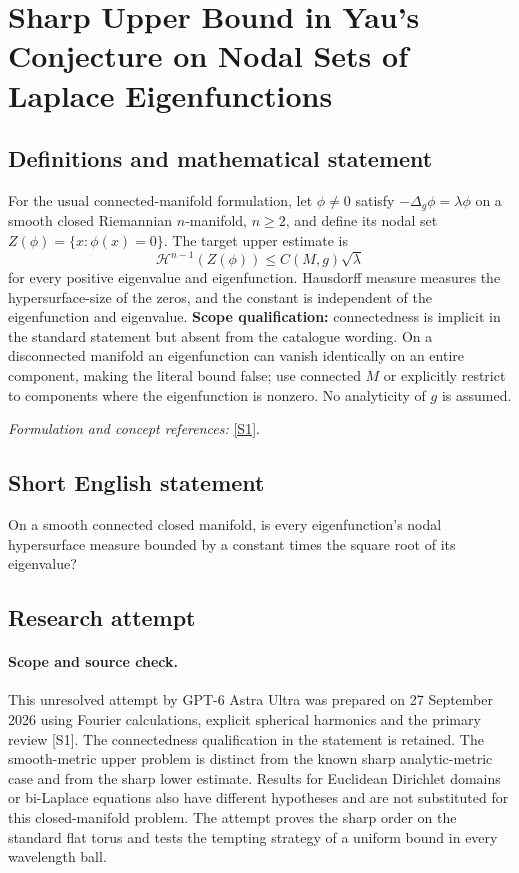 \documentclass[11pt]{article}
\begin{document}
\section*{\texorpdfstring{Sharp Upper Bound in Yau's Conjecture on Nodal Sets of Laplace Eigenfunctions}{Sharp Upper Bound in Yau's Conjecture on Nodal Sets of Laplace Eigenfunctions}}\label{30006830}
\subsection{Definitions and mathematical statement}
For the usual connected-manifold formulation, let $\phi\ne0$ satisfy
$-\Delta_g\phi=\lambda\phi$ on a smooth closed Riemannian $n$-manifold, $n\ge2$, and define its nodal set $Z(\phi)=\{x:\phi(x)=0\}$. The target upper estimate is
\[
 \mathcal H^{n-1}(Z(\phi))\le C(M,g)\sqrt\lambda
\]
for every positive eigenvalue and eigenfunction. Hausdorff measure measures the hypersurface-size of the zeros, and the constant is independent of the eigenfunction and eigenvalue. \textbf{Scope qualification:} connectedness is implicit in the standard statement but absent from the catalogue wording. On a disconnected manifold an eigenfunction can vanish identically on an entire component, making the literal bound false; use connected $M$ or explicitly restrict to components where the eigenfunction is nonzero. No analyticity of $g$ is assumed.
\par\smallskip\textit{Formulation and concept references:} \href{https://archive.intlpress.com/site/pub/files/_fulltext/journals/cdm/2018/2018/0001/CDM-2018-2018-0001-a004.pdf}{[S1]}.

\subsection{Short English statement}
On a smooth connected closed manifold, is every eigenfunction's nodal hypersurface measure bounded by a constant times the square root of its eigenvalue?
\subsection{Research attempt}
\paragraph{Scope and source check.}
This unresolved attempt by GPT-6 Astra Ultra was prepared on 27 September
2026 using Fourier calculations, explicit spherical harmonics and the
primary review [S1]. The connectedness qualification in the statement
is retained. The smooth-metric upper problem is distinct from the known
sharp analytic-metric case and from the sharp lower estimate. Results
for Euclidean Dirichlet domains or bi-Laplace equations also have
different hypotheses and are not substituted for this closed-manifold
problem. The attempt proves the sharp order on the standard flat torus
and tests the tempting strategy of a uniform bound in every wavelength
ball.
\end{document}
